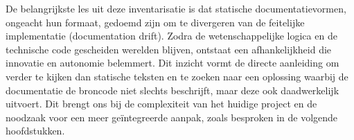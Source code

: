 De belangrijkste les uit deze inventarisatie is dat statische documentatievormen, ongeacht hun formaat, gedoemd zijn om te divergeren van de feitelijke implementatie (documentation drift). Zodra de wetenschappelijke logica en de technische code gescheiden werelden blijven, ontstaat een afhankelijkheid die innovatie en autonomie belemmert. Dit inzicht vormt de directe aanleiding om verder te kijken dan statische teksten en te zoeken naar een oplossing waarbij de documentatie de broncode niet slechts beschrijft, maar deze ook daadwerkelijk uitvoert. Dit brengt ons bij de complexiteit van het huidige project en de noodzaak voor een meer geïntegreerde aanpak, zoals besproken in de volgende hoofdstukken.
